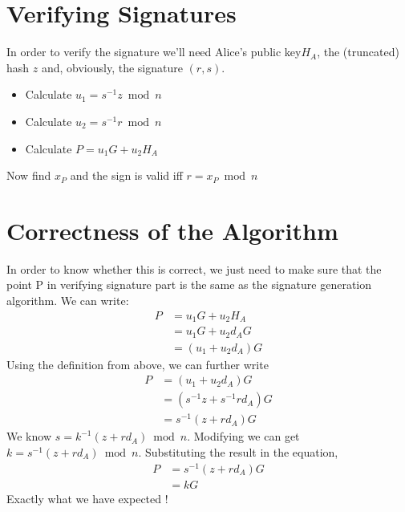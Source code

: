 \documentclass[12pt,letterpaper]{article}
\begin{document}
\section{Verifying Signatures}
In order to verify the signature we'll need Alice's public key$H_A$, the (truncated) hash $z$ and, obviously, the signature $(r,s)$.
\begin{itemize}
    \item Calculate $u_1 = s^{-1} z \bmod{n}$
    \item Calculate $u_2 = s^{-1} r \bmod{n}$
    \item Calculate $P = u_1 G + u_2 H_A$
\end{itemize}
Now find $x_P$ and the sign is valid iff $r = x_P \bmod{n}$
\section{Correctness of the Algorithm}
In order to know whether this is correct, we just need to make sure that the point P in verifying signature part is the same as the signature generation algorithm.
We can write:\\
\begin{align*}
  P & = u_1 G + u_2 H_A \\
    & = u_1 G + u_2 d_A G \\
    & = (u_1 + u_2 d_A) G
\end{align*}
Using the definition from above, we can further write
\begin{align*}
  P & = (u_1 + u_2 d_A) G \\
    & = (s^{-1} z + s^{-1} r d_A) G \\
    & = s^{-1} (z + r d_A) G
\end{align*}
We know $s = k^{-1} (z + rd_A) \bmod{n}$. Modifying we can get $k = s^{-1} (z + rd_A) \bmod{n}$. Substituting the result in the equation, \begin{align*}
  P & = s^{-1} (z + r d_A) G \\
    & = k G
\end{align*}
Exactly what we have expected !
\end{document}

